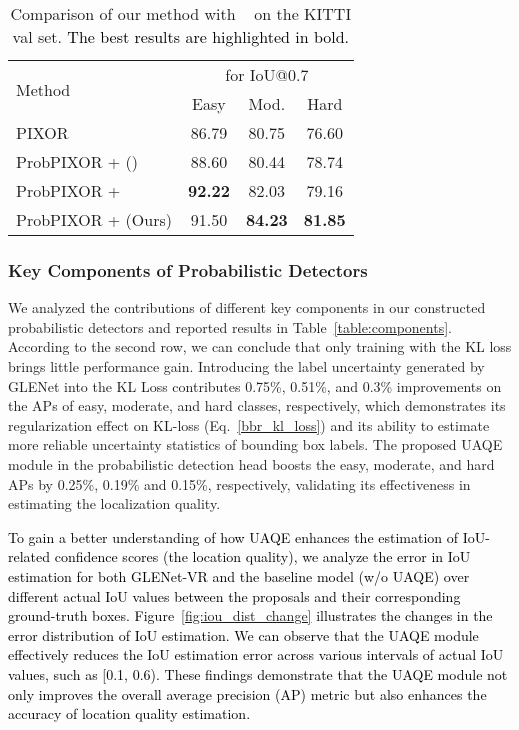 \documentclass[twocolumn]{svjour3}
\newcommand{\revise}[1]{\textcolor{black}{#1}}
\begin{document}
\setlength{\tabcolsep}{4pt}
\begin{table}[htp]
\centering
\caption{Comparison of our method with ~\citep{feng_iros} on the KITTI val set. \revise{The best results are highlighted in bold.}}
\label{table:compare_35}
\begin{tabular}{l|ccc} 
\toprule
\multirow{2}{*}{Method}                    & \multicolumn{3}{c}{ for IoU@0.7}  \\
                                           & Easy  & Mod.  & Hard                        \\ 
\hline
PIXOR~\citep{yang2018pixor}                 					   & 86.79  & 80.75    & 76.60     \\
ProbPIXOR +  ()      & 88.60  & 80.44    & 78.74     \\
ProbPIXOR +  \citep{feng_iros}    & \textbf{92.22} & 82.03    & 79.16     \\
ProbPIXOR +  (Ours)          & 91.50  & \textbf{84.23}    & \textbf{81.85}     \\
\bottomrule
\end{tabular}
\end{table}
\setlength{\tabcolsep}{1.5pt}


\subsubsection{Key Components of Probabilistic Detectors} We analyzed the contributions of different key components in our constructed probabilistic detectors and reported results in Table~\ref{table:components}. According to the second row, we can conclude that only training with the KL loss brings little performance gain. Introducing the label uncertainty generated by GLENet into the KL Loss contributes 0.75\%, 0.51\%, and 0.3\% improvements on the APs of easy, moderate, and hard classes, respectively, which demonstrates its regularization effect on KL-loss (Eq.~\ref{bbr_kl_loss}) and its ability to estimate more reliable uncertainty statistics of bounding box labels. The proposed UAQE module in the probabilistic detection head boosts the easy, moderate, and hard APs by 0.25\%, 0.19\% and 0.15\%, respectively, validating its effectiveness in estimating the localization quality.

\revise{To gain a better understanding of how UAQE enhances the estimation of IoU-related confidence scores (the location quality), we analyze the error in IoU estimation for both GLENet-VR and the baseline model (w/o UAQE) over different actual IoU values between the proposals and their corresponding ground-truth boxes. Figure~\ref{fig:iou_dist_change} illustrates the changes in the error distribution of IoU estimation. We can observe that the UAQE module effectively reduces the IoU estimation error across various intervals of actual IoU values, such as [0.1, 0.6). These findings demonstrate that the UAQE module not only improves the overall average precision (AP) metric but also enhances the accuracy of location quality estimation.
}
\end{document}
